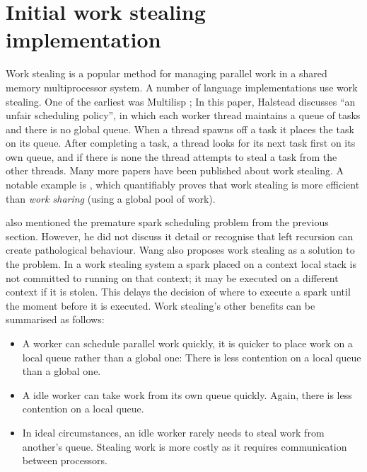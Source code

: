 \section{Initial work stealing implementation}
\label{sec:work_stealing}


Work stealing is a popular method for managing parallel work in a shared
memory multiprocessor system.
A number of language implementations use work stealing.
One of the earliest was Multilisp \citep{halstead:1985:multilisp};
In this paper,
Halstead discusses ``an unfair scheduling policy'',
in which each worker thread maintains a queue of tasks
and there is no global queue.
When a thread spawns off a task it places the task on its queue.
After completing a task, a thread looks for its next task first 
on its own queue, and if there is none
the thread attempts to steal a task from the other threads.
Many more papers have been published about work stealing.
A notable example is
\citet{blumofe:1999:work-stealing},
which quantifiably proves that work stealing is more efficient than
\emph{work sharing}
(using a global pool of work).

\citet{wangp-hons} also mentioned the premature spark scheduling problem
from the previous section.
However, he did not discuss it detail or
recognise that left recursion can create pathological behaviour.
Wang also proposes work stealing as a solution to the problem.
In a work stealing system a spark placed on a context local stack
is not committed to running on that context;
it may be executed on a different context if it is stolen.
This delays the decision of where to execute a spark until the moment
before it is executed.
Work stealing's other benefits can be summarised as follows:

\begin{itemize}

    \item
    A worker can schedule parallel work quickly,
    it is quicker to place work on a local queue rather than a global
    one:
    There is less contention on a local queue than a global one.

    \item
    A idle worker can take work from its own queue quickly.
    Again, there is less contention on a local queue.

    \item
    In ideal circumstances,
    an idle worker rarely needs to steal work from another's queue.
    Stealing work is more costly as it requires communication between
    processors.

\end{itemize}

